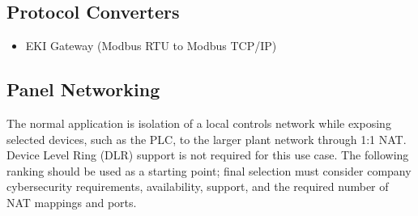 \subsection{Protocol Converters}
\begin{itemize}
  \item EKI Gateway (Modbus RTU to Modbus TCP/IP)
\end{itemize}
\subsection{Panel Networking}
The normal application is isolation of a local controls network while exposing selected devices, such as the PLC, to the larger plant network through 1:1 NAT. Device Level Ring (DLR) support is not required for this use case. The following ranking should be used as a starting point; final selection must consider company cybersecurity requirements, availability, support, and the required number of NAT mappings and ports.

